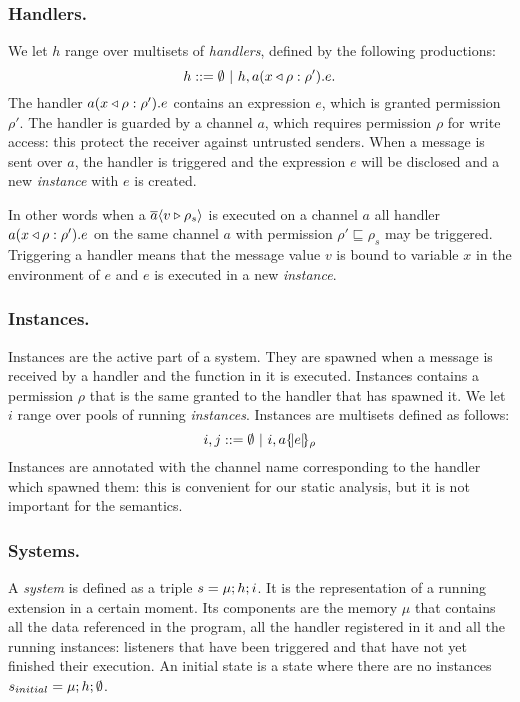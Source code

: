 \subsubsection{Handlers.} 
We let $h$ range over multisets of \emph{handlers}, defined by the following productions:
\[
h ::= \emptyset ~|~ h,\handler{a}{x}{\rho}{e}{\rho'}.
\]
The handler $\handler{a}{x}{\rho}{e}{\rho'}$ contains an expression $e$, which is granted permission $\rho'$. The handler is guarded by a channel $a$, which requires permission $\rho$ for write access: this protect the receiver against untrusted senders. When a message is sent over $a$, the handler is triggered and the expression $e$ will be disclosed and a new \emph{instance} with $e$ is created.

In other words when a $\send{a}{v}{\rho_s}$ is executed on a channel $a$ all handler $\handler{a}{x}{\rho}{e}{\rho'}$ on the same channel $a$ with permission $\rho' \sqsubseteq \rho_s$ may be triggered. Triggering a handler means that the message value $v$ is bound to variable $x$ in the environment of $e$ and $e$ is executed in a new \emph{instance}.

\subsubsection{Instances.} 
Instances are the active part of a system. They are spawned when a message is received by a handler and the function in it is executed. Instances contains a permission $\rho$ that is the same granted to the handler that has spawned it.
We let $i$ range over pools of running \emph{instances}.%
Instances are multisets defined as follows:
\[
i,j ::= \emptyset ~|~ i,\inst{a}{e}{\rho}
\]
Instances are annotated with the channel name corresponding to the handler which spawned them: this is convenient for our static analysis, but it is not important for the semantics.

\subsubsection{Systems.} 
A \emph{system} is defined as a triple $s = \sys{\mu}{h}{i}$. It is the representation of a running extension in a certain moment. Its components are the memory $\mu$ that contains all the data referenced in the program, all the handler registered in it and all the running instances: listeners that have been triggered and that have not yet finished their execution. An initial state is a state where there are no instances $s_{initial} = \sys{\mu}{h}{\emptyset}$.


